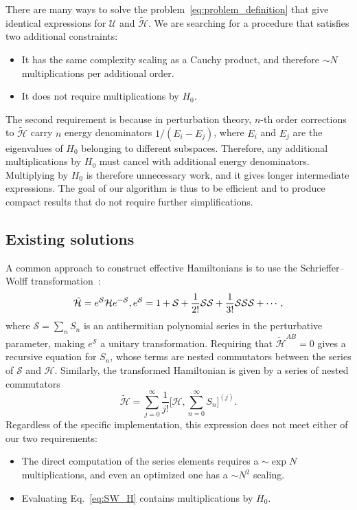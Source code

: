 There are many ways to solve the problem~\eqref{eq:problem_definition} that
give identical expressions for $\mathcal{U}$ and $\tilde{\mathcal{H}}$.
We are searching for a procedure that satisfies two additional constraints:
%
\begin{itemize}
    \item It has the same complexity scaling as a Cauchy product, and therefore
    $\sim N$ multiplications per additional order.
    \item It does not require multiplications by $H_0$.
\end{itemize}
%
The second requirement is because in perturbation theory, $n$-th order  corrections to
$\tilde{\mathcal{H}}$ carry $n$ energy denominators $1/(E_i - E_j)$, where
$E_i$ and $E_j$ are the eigenvalues of $H_0$ belonging to different subspaces.
Therefore, any additional multiplications by $H_0$ must cancel with
additional energy denominators.
Multiplying by $H_0$ is therefore unnecessary work, and it gives longer
intermediate expressions.
The goal of our algorithm is thus to be efficient and to produce compact
results that do not require further simplifications.

\subsection{Existing solutions}
A common approach to construct effective Hamiltonians is to use the
Schrieffer--Wolff transformation~\cite{Schrieffer_1966}:
%
\begin{equation}
\tilde{\mathcal{H}} = e^\mathcal{S} \mathcal{H} e^{-\mathcal{S}}, \\
e^{\mathcal{S}} = 1 + \mathcal{S} + \frac{1}{2!} \mathcal{S} \mathcal{S}
+ \frac{1}{3!} \mathcal{S} \mathcal{S} \mathcal{S} + \cdots,
\end{equation}
%
where $\mathcal{S} = \sum_n S_n$ is an antihermitian polynomial series in the
perturbative parameter, making $e^\mathcal{S}$ a unitary transformation.
Requiring that $\tilde{\mathcal{H}}^{AB} = 0$ gives a recursive equation for
$S_n$, whose terms are nested commutators between the series of $\mathcal{S}$
and $\mathcal{H}$.
Similarly, the transformed Hamiltonian is given by a series of nested
commutators
%
\begin{equation}
\label{eq:SW_H}
\tilde{\mathcal{H}} = \sum_{j=0}^\infty \frac{1}{j!} \Big [\mathcal{H}, \sum_{n=0}^{\infty} S_n \Big ]^{(j)}.
\end{equation}
%
Regardless of the specific implementation, this expression does not meet either
of our two requirements:
\begin{itemize}
  \item The direct computation of the series elements requires a $\sim \exp N$
  multiplications, and even an optimized one has a $\sim N^2$ scaling.
  \item Evaluating Eq.~\eqref{eq:SW_H} contains multiplications by $H_0$.
\end{itemize}

